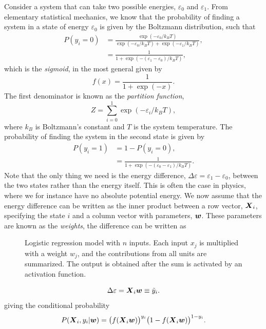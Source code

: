 Consider a system that can take two possible energies, $\varepsilon_0$ and $\varepsilon_1$. From elementary statistical mechanics, we know that the probability of finding a system in a state of energy $\varepsilon_0$ is given by the Boltzmann distribution, such that
\begin{align}
P(y_i=0)&=\frac{\exp(-\varepsilon_0/k_BT)}{\exp(-\varepsilon_0/k_BT)+\exp(-\varepsilon_1/k_BT)},\\
&=\frac{1}{1+\exp(-(\varepsilon_1-\varepsilon_0)/k_BT)},
\end{align}
which is the \textit{sigmoid}, in the most general given by
\begin{equation}
f(x)=\frac{1}{1+\exp(-x)}.
\end{equation}
The first denominator is known as the \textit{partition function},
\begin{equation}
Z=\sum_{i=0}^1\exp(-\varepsilon_i/k_BT),
\label{eq:partition}
\end{equation}
where $k_B$ is Boltzmann's constant and $T$ is the system temperature. The probability of finding the system in the second state is given by
\begin{align}
P(y_i=1)&=1-P(y_i=0),\\
&=\frac{1}{1+\exp(-(\varepsilon_0-\varepsilon_1)/k_BT)}.
\end{align}
Note that the only thing we need is the energy difference, $\Delta\varepsilon=\varepsilon_1-\varepsilon_0$, between the two states rather than the energy itself. This is often the case in physics, where we for instance have no absolute potential energy. We now assume that the energy difference can be written as the inner product between a row vector, $\boldsymbol{{X}}_i$, specifying the state $i$ and a column vector with parameters, $\boldsymbol{{w}}$. These parameters are known as the \textit{weights}, the difference can be written as
\begin{figure}
	\centering
	
	\caption{Logistic regression model with $n$ inputs. Each input $x_{j}$ is multiplied with a weight $w_j$, and the contributions from all units are summarized. The output is obtained after the sum is activated by an activation function.}
	\label{fig:single_perceptron}
\end{figure}
\begin{equation}
\Delta\varepsilon=\boldsymbol{{X}}_i\boldsymbol{{w}}\equiv\tilde{y}_i.
\end{equation}
giving the conditional probability
\begin{equation}
P(\boldsymbol{{X}}_i,y_i|\boldsymbol{{w}})=\big(f(\boldsymbol{{X}}_i\boldsymbol{{w}})\big)^{y_i}\big(1-f(\boldsymbol{{X}}_i\boldsymbol{{w}})\big)^{1-y_i}.
\end{equation}
